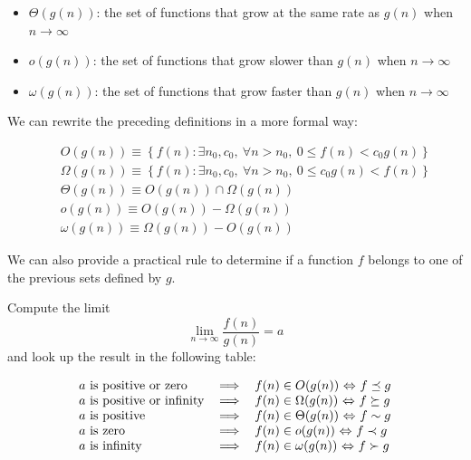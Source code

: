\documentclass[justified, sixbynine]{tufte-book}
\theoremstyle{plain}%
\newtheorem * {corollary}{Corollary}
\theoremstyle{definition}
\theoremstyle{remark}
\newtheorem * {remark}{Remark}
\newtheorem * {note}{Note}
\begin{document}
\begin{fullwidth}
\begin{itemize}
\item  $\Theta (g(n))$: the set of functions that grow at the same rate as $g(n)$ when $%
n\rightarrow \infty $

\item  $o(g(n))$: the set of functions that grow slower than $g(n)$ when $n\rightarrow
\infty $

\item  $\omega (g(n))$: the set of functions that grow faster than $g(n)$ when $n\rightarrow \infty $
\end{itemize}

We can rewrite the preceding definitions in a more formal way:

\begin{eqnarray}
&&O(g(n))\equiv \left\{ f(n):\exists n_0, c_0, \ \forall n>n_0, \
0\leq f(n)<c_0g(n)\right\} \\
&&\Omega (g(n))\equiv \left\{ f(n):\exists n_0, c_0, \ \forall
n>n_0, \ 0\leq c_0g(n)<f(n)\right\} \\
&&\Theta (g(n))\equiv O(g(n))\cap \Omega (g(n)) \\
&&o(g(n))\equiv O(g(n))-\Omega (g(n)) \\
&&\omega (g(n))\equiv \Omega (g(n))-O(g(n))
\end{eqnarray}

We can also provide a practical rule to determine if a function $f$ belongs to one of the previous sets defined by $g$.

Compute the limit
\begin{equation}
\lim_{n\rightarrow \infty }\frac{f(n)}{g(n)}=a
\end{equation}
and look up the result in the following table:

\begin{equation}
\begin{tabular}{lll}
$a$ is positive or zero & $\Longrightarrow $ & $f(n)\in O(g(n))$ $%
\Leftrightarrow $ $f\preceq g$ \\
$a$ is positive or infinity & $\Longrightarrow $ & $f(n)\in \Omega (g(n))$ $%
\Leftrightarrow $ $f\succeq g$ \\
$a$ is positive & $\Longrightarrow $ & $f(n)\in \Theta (g(n))$ $%
\Leftrightarrow $ $f\sim g$ \\
$a$ is zero & $\Longrightarrow $ & $f(n)\in o(g(n))$ $\Leftrightarrow $ $%
f\prec g$ \\
$a$ is infinity & $\Longrightarrow $ & $f(n)\in \omega (g(n))$ $%
\Leftrightarrow $ $f\succ g$%
\end{tabular}
\end{equation}


\end{fullwidth}
\end{document}
